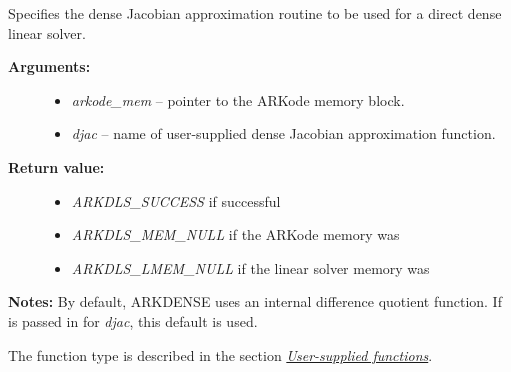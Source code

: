\documentclass[letterpaper,10pt,english]{sphinxmanual}
\begin{document}
\begin{fulllineitems}
\label{c_interface/User_callable:ARKDlsSetDenseJacFn}
Specifies the dense Jacobian approximation routine to
be used for a direct dense linear solver.
\begin{description}
\item[{\textbf{Arguments:}}] \leavevmode\begin{itemize}
\item {} 
\emph{arkode\_mem} -- pointer to the ARKode memory block.

\item {} 
\emph{djac} -- name of user-supplied dense Jacobian approximation function.

\end{itemize}

\item[{\textbf{Return value:}}] \leavevmode\begin{itemize}
\item {} 
\emph{ARKDLS\_SUCCESS}  if successful

\item {} 
\emph{ARKDLS\_MEM\_NULL}  if the ARKode memory was 

\item {} 
\emph{ARKDLS\_LMEM\_NULL} if the linear solver memory was 

\end{itemize}

\end{description}

\textbf{Notes:} By default, ARKDENSE uses an internal difference quotient
function.  If  is passed in for \emph{djac}, this default is used.

The function type {\hyperref[c_interface/User_supplied:ARKDlsDenseJacFn]{}} is described in the section
{\hyperref[c_interface/User_supplied:cinterface-usersupplied]{\emph{User-supplied functions}}}.

\end{fulllineitems}

\end{document}

